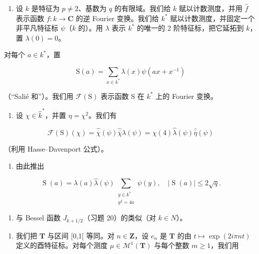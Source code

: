 \begin{enumerate}
\def\labelenumi{\arabic{enumi})}
\setcounter{enumi}{49}
\tightlist
\item
  设 \(k\) 是特征为 \(p \neq 2\)、基数为 \(q\) 的有限域。我们给 \(k\) 赋以计数测度，并用 \(\widehat{f}\) 表示函数 \(f: k \to \mathbf{C}\) 的逆 Fourier 变换。我们给 \(k^*\) 赋以计数测度，并固定一个非平凡特征标 \(\psi\)（\(k\) 的）。用 \(\lambda\) 表示 \(k^*\) 的唯一的 2 阶特征标，把它延拓到 \(k\)，置 \(\lambda(0) = 0\)。
\end{enumerate}

对每个 \(a \in k^{*}\)，置

\[
\mathrm{S} (a) = \sum_ {x \in k ^ {*}} \lambda (x) \psi (a x + x ^ {- 1})
\]

（“Salié 和”）。我们用 \(\mathcal{F}(\mathrm{S})\) 表示函数 S 在 \(k^{*}\) 上的 Fourier 变换。

\begin{enumerate}
\def\labelenumi{\alph{enumi})}
\tightlist
\item
  设 \(\chi \in \widehat{k}^*\)，并置 \(\eta = \chi^2\)。我们有
\end{enumerate}

\[
\mathcal {F} (\mathrm{S}) (\chi) = \widehat {\overline {{\chi}}} (\psi) \widehat {\overline {{\chi}}} \lambda (\psi) = \chi (4) \widehat {\lambda} (\psi) \widehat {\overline {{\eta}}} (\psi)
\]

（利用 Hasse–Davenport 公式）。

\begin{enumerate}
\def\labelenumi{\alph{enumi})}
\setcounter{enumi}{1}
\tightlist
\item
  由此推出
\end{enumerate}

\[
\operatorname{S}(a) = \lambda (a)\widehat{\lambda} (\psi)\sum_{\substack{y\in k^{*}\\ y^{2} = 4a}}\psi (y),\quad |\operatorname{S}(a)|\leqslant 2\sqrt{q}.
\]

\begin{enumerate}
\def\labelenumi{\alph{enumi})}
\setcounter{enumi}{2}
\tightlist
\item
  与 Bessel 函数 \(J_{k+1/2}\)（习题 20）的类似（对 \(k \in N\)）。
\end{enumerate}

\begin{enumerate}
\def\labelenumi{\arabic{enumi})}
\setcounter{enumi}{50}
\tightlist
\item
  我们把 \(\mathbf{T}\) 与区间 {[}0,1{[} 等同。对 \(n \in \mathbf{Z}\)，设 \(e_n\) 是 \(\mathbf{T}\) 的由 \(t \mapsto \exp(2i\pi nt)\) 定义的酉特征标。对每个测度 \(\mu \in \mathcal{M}^1(\mathbf{T})\) 与每个整数 \(m \geqslant 1\)，我们用
\end{enumerate}

